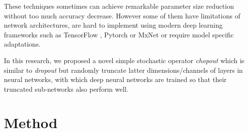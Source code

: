 \documentclass{article}
\begin{document}
    These techniques sometimes can achieve remarkable parameter size reduction without too much accuracy decrease. However some of them have limitations of network architectures, are hard to implement using modern deep learning frameworks such as TensorFlow \cite{abadi2016tensorflow}, Pytorch \cite{paszke2017automatic} or MxNet \cite{chen2015mxnet} or require model specific adaptations.

    In this research, we proposed a novel simple stochastic operator \textit{chopout} which is similar to \textit{dropout} \cite{srivastava2014dropout} but randomly truncate latter dimensions/channels of layers in neural networks, with which deep neural networks are trained so that their truncated sub-networks also perform well. 

    
    \section{Method}
    \label{sec:method}
    
\end{document}
